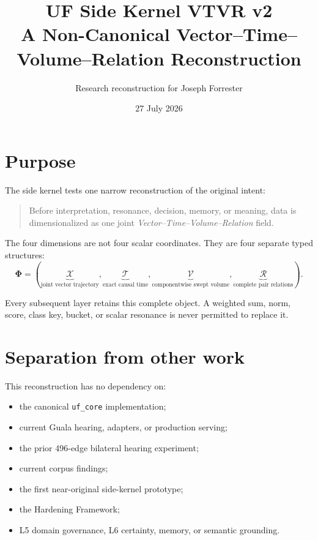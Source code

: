 \documentclass[11pt]{article}
\title{UF Side Kernel VTVR v2\\
\large A Non-Canonical Vector--Time--Volume--Relation Reconstruction}
\author{Research reconstruction for Joseph Forrester}
\date{27 July 2026}
\newcommand{\Volume}{\mathcal{V}}
\newcommand{\Relation}{\mathcal{R}}
\newcommand{\VTVR}{\boldsymbol{\Phi}}
\begin{document}
\maketitle

\begin{center}
\end{center}

\tableofcontents
\newpage

\section{Purpose}

The side kernel tests one narrow reconstruction of the original intent:

\begin{quote}
Before interpretation, resonance, decision, memory, or meaning, data is
dimensionalized as one joint \emph{Vector--Time--Volume--Relation} field.
\end{quote}

The four dimensions are not four scalar coordinates. They are four separate
typed structures:
\[
  \VTVR
  =
  \left(
    \underbrace{\mathcal{X}}_{\text{joint vector trajectory}},
    \underbrace{\mathcal{T}}_{\text{exact causal time}},
    \underbrace{\Volume}_{\text{componentwise swept volume}},
    \underbrace{\Relation}_{\text{complete pair relations}}
  \right).
\]

Every subsequent layer retains this complete object. A weighted sum, norm,
score, class key, bucket, or scalar resonance is never permitted to replace
it.

\section{Separation from other work}

This reconstruction has no dependency on:

\begin{itemize}[nosep]
  \item the canonical \texttt{uf\_core} implementation;
  \item current Guala hearing, adapters, or production serving;
  \item the prior 496-edge bilateral hearing experiment;
  \item current corpus findings;
  \item the first near-original side-kernel prototype;
  \item the Hardening Framework;
  \item L5 domain governance, L6 certainty, memory, or semantic grounding.
\end{itemize}
\end{document}
